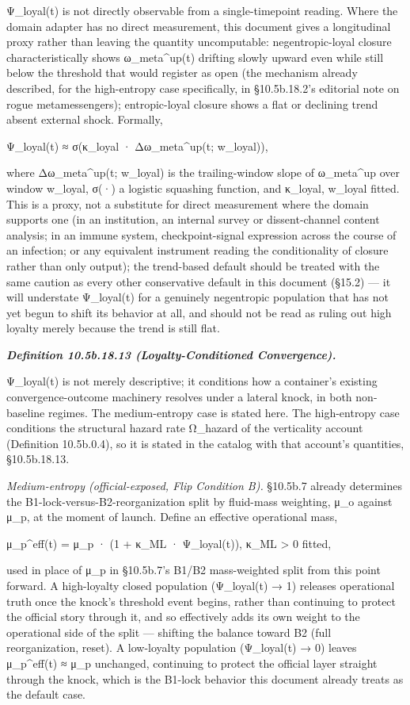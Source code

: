 \documentclass[
]{article}
\begin{document}
Ψ\_loyal(t) is not directly observable from a single-timepoint reading.
Where the domain adapter has no direct measurement, this document gives
a longitudinal proxy rather than leaving the quantity uncomputable:
negentropic-loyal closure characteristically shows ω\_meta\^{}up(t)
drifting slowly upward even while still below the threshold that would
register as open (the mechanism already described, for the high-entropy
case specifically, in §10.5b.18.2's editorial note on rogue
metamessengers); entropic-loyal closure shows a flat or declining trend
absent external shock. Formally,

Ψ\_loyal(t) ≈ σ(κ\_loyal · Δω\_meta\^{}up(t; w\_loyal)),

where Δω\_meta\^{}up(t; w\_loyal) is the trailing-window slope of
ω\_meta\^{}up over window w\_loyal, σ(·) a logistic squashing function,
and κ\_loyal, w\_loyal fitted. This is a proxy, not a substitute for
direct measurement where the domain supports one (in an institution, an
internal survey or dissent-channel content analysis; in an immune
system, checkpoint-signal expression across the course of an infection;
or any equivalent instrument reading the conditionality of closure
rather than only output); the trend-based default should be treated with
the same caution as every other conservative default in this document
(§15.2) --- it will understate Ψ\_loyal(t) for a genuinely negentropic
population that has not yet begun to shift its behavior at all, and
should not be read as ruling out high loyalty merely because the trend
is still flat.

\emph{\textbf{Definition 10.5b.18.13 (Loyalty-Conditioned
Convergence).}}

Ψ\_loyal(t) is not merely descriptive; it conditions how a container's
existing convergence-outcome machinery resolves under a lateral knock,
in both non-baseline regimes. The medium-entropy case is stated here.
The high-entropy case conditions the structural hazard rate Ω\_hazard of
the verticality account (Definition 10.5b.0.4), so it is stated in the
catalog with that account's quantities, §10.5b.18.13.

\emph{Medium-entropy (official-exposed, Flip Condition B).} §10.5b.7
already determines the B1-lock-versus-B2-reorganization split by
fluid-mass weighting, μ\_o against μ\_p, at the moment of launch. Define
an effective operational mass,

μ\_p\^{}eff(t) = μ\_p · (1 + κ\_ML · Ψ\_loyal(t)), κ\_ML \textgreater{}
0 fitted,

used in place of μ\_p in §10.5b.7's B1/B2 mass-weighted split from this
point forward. A high-loyalty closed population (Ψ\_loyal(t) → 1)
releases operational truth once the knock's threshold event begins,
rather than continuing to protect the official story through it, and so
effectively adds its own weight to the operational side of the split ---
shifting the balance toward B2 (full reorganization, reset). A
low-loyalty population (Ψ\_loyal(t) → 0) leaves μ\_p\^{}eff(t) ≈ μ\_p
unchanged, continuing to protect the official layer straight through the
knock, which is the B1-lock behavior this document already treats as the
default case.
\end{document}
